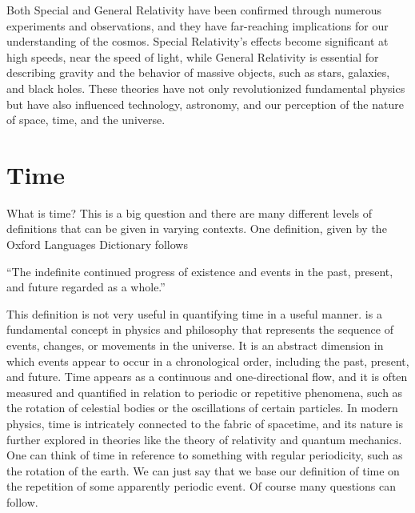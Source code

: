 Both Special and General Relativity have been confirmed through numerous experiments and observations, and they have far-reaching implications for our understanding of the cosmos. Special Relativity's effects become significant at high speeds, near the speed of light, while General Relativity is essential for describing gravity and the behavior of massive objects, such as stars, galaxies, and black holes. These theories have not only revolutionized fundamental physics but have also influenced technology, astronomy, and our perception of the nature of space, time, and the universe.


\section{Time}

What is time? This is a big question and there are many different levels of definitions that can be given in varying contexts. One definition, given by the Oxford Languages Dictionary follows

\begin{quotationbox}
``The indefinite continued progress of existence and events in the past, present, and future regarded as a whole.''
\end{quotationbox}

This definition is not very useful in quantifying time in a useful manner.  is a fundamental concept in physics and philosophy that represents the sequence of events, changes, or movements in the universe. It is an abstract dimension in which events appear to occur in a chronological order, including the past, present, and future. Time appears as a continuous and one-directional flow, and it is often measured and quantified in relation to periodic or repetitive phenomena, such as the rotation of celestial bodies or the oscillations of certain particles. In modern physics, time is intricately connected to the fabric of spacetime, and its nature is further explored in theories like the theory of relativity and quantum mechanics. One can think of time in reference to something with regular periodicity, such as the rotation of the earth. We can just say that we base our definition of time on the repetition of some apparently periodic event. Of course many questions can follow.

